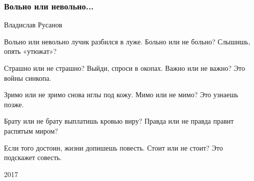  
 
 

\subsubsection{Вольно или невольно...}
\label{sec:poetry.rus.dnr.vladislav_rusanov.volno_ili_nevolno}

Владислав Русанов

Вольно или невольно
лучик разбился в луже.
Больно или не больно?
Слышишь, опять «утюжат»?

Страшно или не страшно?
Выйди, спроси в окопах.
Важно или не важно?
Это войны синкопа.

Зримо или не зримо
снова иглы под кожу.
Мимо или не мимо?
Это узнаешь позже.

Брату или не брату
выплатишь кровью виру?
Правда или не правда
правит распятым миром?

Если того достоин,
жизни допишешь повесть.
Стоит или не стоит?
Это подскажет совесть.

2017 
